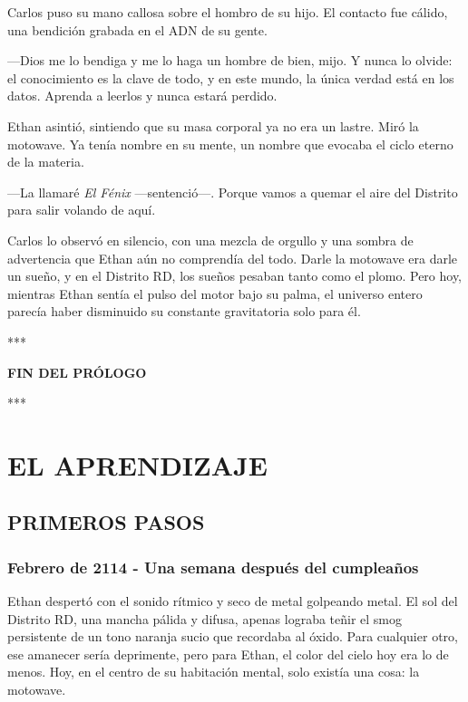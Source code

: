 \documentclass[11pt,twoside]{book}
\begin{document}
Carlos puso su mano callosa sobre el hombro de su hijo. El contacto fue cálido, una bendición grabada en el ADN de su gente.

---Dios me lo bendiga y me lo haga un hombre de bien, mijo. Y nunca lo olvide: el conocimiento es la clave de todo, y en este mundo, la única verdad está en los datos. Aprenda a leerlos y nunca estará perdido.

Ethan asintió, sintiendo que su masa corporal ya no era un lastre. Miró la motowave. Ya tenía nombre en su mente, un nombre que evocaba el ciclo eterno de la materia.

---La llamaré \textit{El Fénix} ---sentenció---. Porque vamos a quemar el aire del Distrito para salir volando de aquí.

Carlos lo observó en silencio, con una mezcla de orgullo y una sombra de advertencia que Ethan aún no comprendía del todo. Darle la motowave era darle un sueño, y en el Distrito RD, los sueños pesaban tanto como el plomo. Pero hoy, mientras Ethan sentía el pulso del motor bajo su palma, el universo entero parecía haber disminuido su constante gravitatoria solo para él.

\bigskip
\begin{center}***\end{center}
\bigskip

\textbf{FIN DEL PRÓLOGO}


\bigskip
\begin{center}***\end{center}
\bigskip


\part{EL APRENDIZAJE}

\chapter{PRIMEROS PASOS}

\section*{Febrero de 2114 - Una semana después del cumpleaños}

Ethan despertó con el sonido rítmico y seco de metal golpeando metal. El sol del Distrito RD, una mancha pálida y difusa, apenas lograba teñir el smog persistente de un tono naranja sucio que recordaba al óxido. Para cualquier otro, ese amanecer sería deprimente, pero para Ethan, el color del cielo hoy era lo de menos. Hoy, en el centro de su habitación mental, solo existía una cosa: la motowave.
\end{document}
